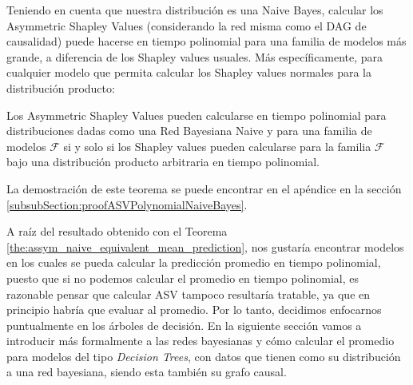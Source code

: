 Teniendo en cuenta que nuestra distribución es una Naive Bayes, calcular los Asymmetric Shapley Values (considerando la red misma como el DAG de causalidad) puede hacerse en tiempo polinomial para una familia de modelos más grande, a diferencia de los Shapley values usuales. Más específicamente, para cualquier modelo que permita calcular los Shapley values normales para la distribución producto:


\begin{theorem}\label{the:assym_naive_equivalent_mean_prediction}
	Los Asymmetric Shapley Values pueden calcularse en tiempo polinomial para distribuciones dadas como una Red Bayesiana Naive y para una familia de modelos \(\mathcal{F}\) si y solo si los Shapley values pueden calcularse para la familia \(\mathcal{F}\) bajo una distribución producto arbitraria en tiempo polinomial.
\end{theorem}

La demostración de este teorema se puede encontrar en el apéndice en la sección \ref{subsubSection:proofASVPolynomialNaiveBayes}.

A raíz del resultado obtenido con el Teorema \ref{the:assym_naive_equivalent_mean_prediction}, nos gustaría encontrar modelos en los cuales se pueda calcular la predicción promedio en tiempo polinomial, puesto que si no podemos calcular el promedio en tiempo polinomial, es razonable pensar que calcular ASV tampoco resultaría tratable, ya que en principio habría que evaluar al promedio. Por lo tanto, decidimos enfocarnos puntualmente en los árboles de decisión. En la siguiente sección vamos a introducir más formalmente a las redes bayesianas y cómo calcular el promedio para modelos del tipo \emph{Decision Trees}, con datos que tienen como su distribución a una red bayesiana, siendo esta también su grafo causal. 

